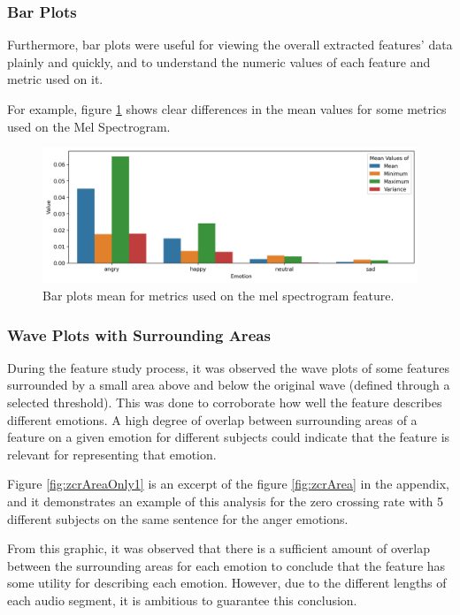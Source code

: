\subsubsection{Bar Plots}

Furthermore, bar plots were useful for viewing the overall extracted features' data plainly and quickly, and to understand the numeric values of each feature and metric used on it.

For example, figure \ref{fig:melBarPlot} shows clear differences in the mean values for some metrics used on the Mel Spectrogram.

\begin{figure}[H]
	\centering
	\includegraphics[width=\textwidth]{figs/4_1_traditional/meanFeatBarPlot.png}
	\caption{Bar plots mean for metrics used on the mel spectrogram feature.}
	\label{fig:melBarPlot}
\end{figure}


\subsubsection{Wave Plots with Surrounding Areas}

During the feature study process, it was observed the wave plots of some features surrounded by a small area above and below the original wave (defined through a selected threshold). This was done to corroborate how well the feature describes different emotions. A high degree of overlap between surrounding areas of a feature on a given emotion for different subjects could indicate that the feature is relevant for representing that emotion.

Figure \ref{fig:zcrAreaOnly1} is an excerpt of the figure \ref{fig:zcrArea} in the appendix, and it demonstrates an example of this analysis for the zero crossing rate with 5 different subjects on the same sentence for the anger emotions.

From this graphic, it was observed that there is a sufficient amount of overlap between the surrounding areas for each emotion to conclude that the feature has some utility for describing each emotion. However, due to the different lengths of each audio segment, it is ambitious to guarantee this conclusion.

